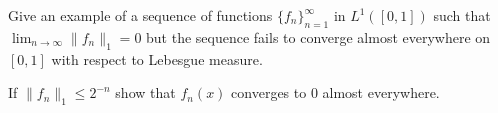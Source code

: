 \begin{alist}
\item Give an example of a sequence of functions
$\{f_n\}_{n=1}^{\infty}$ in $L^1([0,1])$ such that $\lim_{n\rightarrow
\infty}\|f_n\|_1=0$ but the sequence fails to converge almost
everywhere on $[0,1]$ with respect to Lebesgue measure.
\item If $\|f_n\|_1\leq 2^{-n}$ show that $f_n(x)$ converges to $0$
almost everywhere.
\end{alist}
